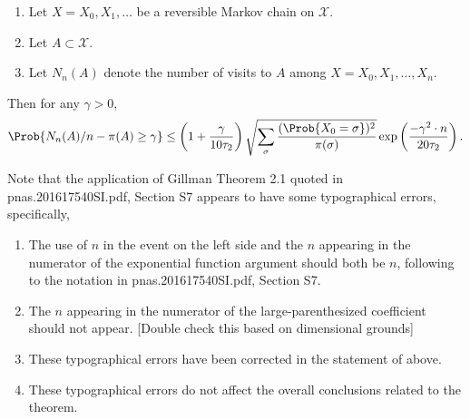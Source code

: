 \documentclass[12pt]{article}
\begin{document}
\begin{theorem}%
    \label{thm:serialsignificance:gillman}
    \begin{enumerate}
        \item
            Let \( X = X_0, X_1, \dots \) be a reversible Markov chain
            on \( \mathcal{X} \).
        \item
            Let \( A \subset \mathcal{X} \).
        \item
            Let \( N_n(A) \) denote the number of visits to \( A \)
            among \( X = X_0, X_1, \dots, X_n \).
    \end{enumerate}
    Then for any \( \gamma > 0 \),
    \[
        \Prob{N_n(A)/n - \pi(A) \ge \gamma} \le \left( 1 + \frac{\gamma}
        {10 \tau_2} \right) \sqrt{\sum_{\sigma} \frac{(\Prob{X_0 =
        \sigma})^2}{\pi (\sigma)}} \exp \left( \frac{-\gamma^2 \cdot n}{20
        \tau_2} \right).
    \]
\end{theorem}

\begin{remark}
    Note that the application of Gillman Theorem 2.1 quoted in
    pnas.201617540SI.pdf, Section S7 appears to have some typographical
    errors, specifically,
    \begin{enumerate}
        \item
            The use of \( n \) in the event on the left side and the \(
            n \) appearing in the numerator of the exponential function
            argument should both be \( n \), following to the notation
            in pnas.201617540SI.pdf, Section S7.
        \item
            The \( n \) appearing in the numerator of the
            large-parenthesized coefficient should not appear. [Double
            check this based on dimensional grounds]
        \item
            These typographical errors have been corrected in the
            statement of above.
        \item
            These typographical errors do not affect the overall
            conclusions related to the theorem.
    \end{enumerate}
\end{remark}
\end{document}
